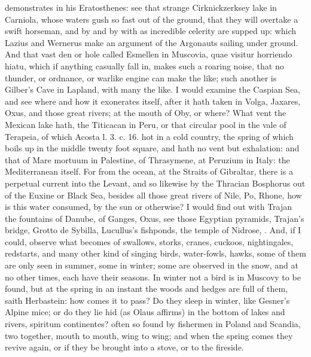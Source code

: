 {demonstrates in his Eratosthenes: see that strange
Cirknickzerksey lake in Carniola, whose waters gush so fast out
of the ground, that they will overtake a swift horseman, and by and by
with as incredible celerity are supped up: which Lazius and Wernerus
make an argument of the Argonauts sailing under ground. And that vast
den or hole called Esmellen in Muscovia, quae visitur horriendo
hiatu, \etc{} which if anything casually fall in, makes such a roaring
noise, that no thunder, or ordnance, or warlike engine can make the
like; such another is Gilber's Cave in Lapland, with many the like. I
would examine the Caspian Sea, and see where and how it exonerates
itself, after it hath taken in Volga, Jaxares, Oxus, and those great
rivers; at the mouth of Oby, or where? What vent the Mexican lake hath,
the Titicacan in Peru, or that circular pool in the vale of Terapeia,
of which Acosta l. 3. c. 16. hot in a cold country, the spring of which
boils up in the middle twenty foot square, and hath no vent but
exhalation: and that of Mare mortuum in Palestine, of Thrasymene, at
Peruzium in Italy: the Mediterranean itself. For from the ocean, at the
Straits of Gibraltar, there is a perpetual current into the Levant, and
so likewise by the Thracian Bosphorus out of the Euxine or Black Sea,
besides all those great rivers of Nile, Po, Rhone, \etc{} how is this
water consumed, by the sun or otherwise? I would find out with Trajan
the fountains of Danube, of Ganges, Oxus, see those Egyptian pyramids,
Trajan's bridge, Grotto de Sybilla, Lucullus's fishponds, the temple of
Nidrose, \etc. And, if I could, observe what becomes of swallows,
storks, cranes, cuckoos, nightingales, redstarts, and many other kind
of singing birds, water-fowls, hawks, \etc{} some of them are only seen in
summer, some in winter; some are observed in the snow, and at no
other times, each have their seasons. In winter not a bird is in
Muscovy to be found, but at the spring in an instant the woods and
hedges are full of them, saith Herbastein: how comes it to pass?
Do they sleep in winter, like Gesner's Alpine mice; or do they lie hid
(as Olaus affirms) in the bottom of lakes and rivers, spiritum
continentes? often so found by fishermen in Poland and Scandia, two
together, mouth to mouth, wing to wing; and when the spring comes they
revive again, or if they be brought into a stove, or to the fireside.

}
